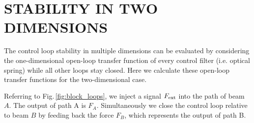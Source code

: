 \section{STABILITY IN TWO DIMENSIONS}
\label{app:C}
The control loop stability in multiple dimensions can be evaluated by considering the one-dimensional open-loop transfer function of every control filter (i.e. optical spring) while all other loops stay closed. Here we calculate these open-loop transfer functions for the two-dimensional case.

Referring to Fig.\,\ref{fig:block_loops}, we inject a signal %
$F_{\rm ext}$ into the path of beam $A$. The output of path A is $F_A$. %
Simultaneously we close the control loop relative to beam $B$
by feeding back the force $F_B$, which represents the output of path B.

